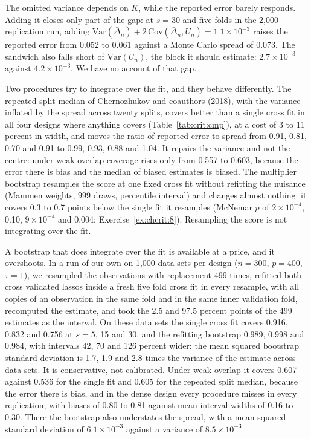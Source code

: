The omitted variance depends on $K$, while the reported error barely responds. Adding it closes only part of the gap: at $s = 30$ and five folds in the 2,000 replication run, adding $\mathrm{Var}(\bar\Delta_n) + 2\,\mathrm{Cov}(\bar\Delta_n, U_n) = 1.1\times 10^{-3}$ raises the reported error from 0.052 to 0.061 against a Monte Carlo spread of 0.073. The sandwich also falls short of $\mathrm{Var}(U_n)$, the block it should estimate: $2.7\times 10^{-3}$ against $4.2\times 10^{-3}$. We have no account of that gap.

Two procedures try to integrate over the fit, and they behave differently. The repeated split median of Chernozhukov and coauthors (2018), with the variance inflated by the spread across twenty splits, covers better than a single cross fit in all four designs where anything covers (Table~\ref{tab:crit:cmp}), at a cost of 3 to 11 percent in width, and moves the ratio of reported error to spread from 0.91, 0.81, 0.70 and 0.91 to 0.99, 0.93, 0.88 and 1.04. It repairs the variance and not the centre: under weak overlap coverage rises only from 0.557 to 0.603, because the error there is bias and the median of biased estimates is biased. The multiplier bootstrap resamples the score at one fixed cross fit without refitting the nuisance (Mammen weights, 999 draws, percentile interval) and changes almost nothing: it covers 0.3 to 0.7 points below the single fit it resamples (McNemar $p$ of $2\times 10^{-4}$, 0.10, $9\times 10^{-4}$ and 0.004; Exercise~\ref{ex:chcrit:8}). Resampling the score is not integrating over the fit.

A bootstrap that does integrate over the fit is available at a price, and it overshoots. In a run of our own on 1,000 data sets per design ($n = 300$, $p = 400$, $\tau = 1$), we resampled the observations with replacement 499 times, refitted both cross validated lassos inside a fresh five fold cross fit in every resample, with all copies of an observation in the same fold and in the same inner validation fold, recomputed the estimate, and took the 2.5 and 97.5 percent points of the 499 estimates as the interval. On these data sets the single cross fit covers 0.916, 0.832 and 0.756 at $s = 5$, 15 and 30, and the refitting bootstrap 0.989, 0.998 and 0.984, with intervals 42, 70 and 126 percent wider: the mean squared bootstrap standard deviation is 1.7, 1.9 and 2.8 times the variance of the estimate across data sets. It is conservative, not calibrated. Under weak overlap it covers 0.607 against 0.536 for the single fit and 0.605 for the repeated split median, because the error there is bias, and in the dense design every procedure misses in every replication, with biases of 0.80 to 0.81 against mean interval widths of 0.16 to 0.30. There the bootstrap also understates the spread, with a mean squared standard deviation of $6.1\times 10^{-3}$ against a variance of $8.5\times 10^{-3}$.

